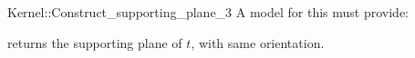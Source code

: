 \begin{ccRefFunctionObjectConcept}{Kernel::Construct_supporting_plane_3}
A model for this must provide:


       {returns the supporting plane of $t$, with same orientation.}

\ccIsModel{}

\end{ccRefFunctionObjectConcept}
